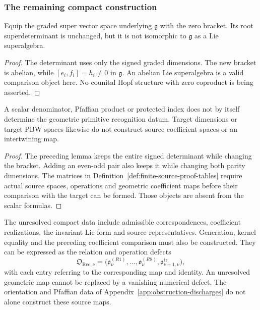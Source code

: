 \subsubsection*{The remaining compact construction}

\begin{lemma}
\label{lem:signed-dimensions-miss}
Equip the graded super vector space underlying $\mathfrak g$ with
the zero bracket. Its root superdeterminant is unchanged, but it
is not isomorphic to $\mathfrak g$ as a Lie superalgebra.
\end{lemma}
\begin{proof}
The determinant uses only the signed graded dimensions.
The new bracket is abelian, while $[e_i,f_i]=h_i\ne0$ in
$\mathfrak g$. An abelian Lie superalgebra is a valid comparison
object here. No counital Hopf structure with zero coproduct is
being asserted.
\end{proof}

\begin{lemma}
\label{lem:first-window-scalar-exclusions}
A scalar denominator, Pfaffian product or protected index does
not by itself determine the geometric primitive recognition datum.
Target dimensions or target PBW spaces likewise do not construct
source coefficient spaces or an intertwining map.
\end{lemma}
\begin{proof}
The preceding lemma keeps the entire signed determinant while
changing the bracket. Adding an even-odd pair also keeps it while
changing both parity dimensions. The matrices in
Definition~\ref{def:finite-source-proof-tables} require actual
source spaces, operations and geometric coefficient maps before
their comparison with the target can be formed. Those objects are
absent from the scalar formulas.
\end{proof}

The unresolved compact data include admissible correspondences,
coefficient realizations, the invariant Lie form and source
representatives. Generation, kernel equality and the preceding
coefficient comparison must also be constructed. They can be
expressed as the relation and operation defects
\[
 \mathfrak O_{\mathrm{Rec},\nu}
 =\bigl(\mathfrak o^{(R1)}_\nu,\ldots,
        \mathfrak o^{(R8)}_\nu,
        \mathfrak o^{\mathrm{tr}}_{\nu+1,\nu}\bigr),
\]
with each entry referring to the corresponding map and identity.
An unresolved geometric map cannot be replaced by a vanishing
numerical defect. The orientation and Pfaffian
data of Appendix~\ref{app:obstruction-discharges} do not alone
construct these source maps.

